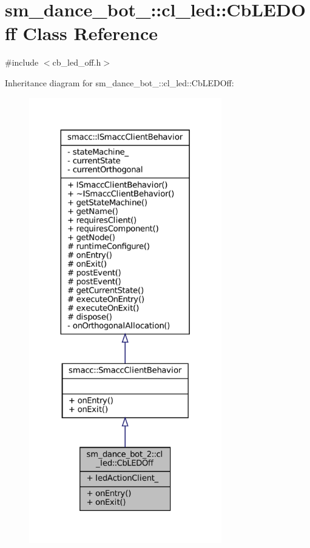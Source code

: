 \hypertarget{classsm__dance__bot__2_1_1cl__led_1_1CbLEDOff}{}\section{sm\+\_\+dance\+\_\+bot\+\_\+:\+:cl\+\_\+led\+:\+:Cb\+L\+E\+D\+Off Class Reference}
\label{classsm__dance__bot__2_1_1cl__led_1_1CbLEDOff}


{\ttfamily \#include $<$cb\+\_\+led\+\_\+off.\+h$>$}



Inheritance diagram for sm\+\_\+dance\+\_\+bot\+\_\+:\+:cl\+\_\+led\+:\+:Cb\+L\+E\+D\+Off\+:
\nopagebreak
\begin{figure}[H]
\begin{center}
\leavevmode
\includegraphics[height=550pt]{classsm__dance__bot__2_1_1cl__led_1_1CbLEDOff__inherit__graph}
\end{center}
\end{figure}


